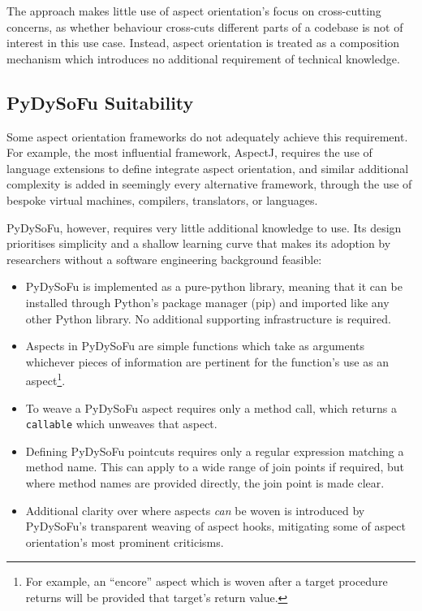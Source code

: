 The approach makes little use of aspect orientation's focus on cross-cutting
concerns, as whether behaviour cross-cuts different parts of a codebase is not
of interest in this use case. Instead, aspect orientation is treated as a
composition mechanism which introduces no additional requirement of technical
knowledge.

\subsection{PyDySoFu Suitability}\label{subsec:optimisation_with_aspects_usingpdsf}
Some aspect orientation frameworks do not adequately achieve this requirement.
For example, the most influential framework, AspectJ, requires the use of
language extensions to define integrate aspect
orientation\cite{AspectJLanguageAndTools}, and similar additional complexity is
added in seemingly every alternative framework, through the use of bespoke
virtual machines, compilers, translators, or
languages\cite{rajan2006nu_towardsAO_invocation,popovici2003JITaspects,AspectCplusplusDesignImpl,baker2002maya}.

PyDySoFu, however, requires very little additional knowledge to use. Its design
prioritises simplicity and a shallow learning curve that makes its adoption by
researchers without a software engineering background feasible: 

\begin{itemize}
    \item PyDySoFu is implemented as a pure-python library, meaning that it can
    be installed through Python's package manager (pip) and imported like any
    other Python library. No additional supporting infrastructure is required.
    \item Aspects in PyDySoFu are simple functions which take as arguments
    whichever pieces of information are pertinent for the function's use as an
    aspect\footnote{For example, an ``encore'' aspect which is woven after a
    target procedure returns will be provided that target's return value.}.
    \item To weave a PyDySoFu aspect requires only a method call, which returns a
    \lstinline{callable} which unweaves that aspect.
    \item Defining PyDySoFu pointcuts requires only a regular expression
    matching a method name. This can apply to a wide range of join points if
    required, but where method names are provided directly, the join point is
    made clear.
    \item Additional clarity over where aspects \emph{can} be woven is
    introduced by PyDySoFu's transparent weaving of aspect hooks, mitigating
    some of aspect orientation's most prominent criticisms.
\end{itemize}

